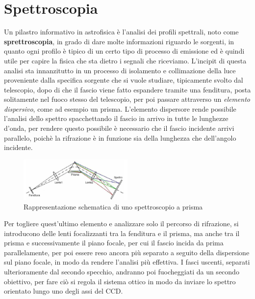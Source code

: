 \chapter{Spettroscopia}

Un pilastro informativo in astrofisica è l'analisi dei profili spettrali, noto come \textbf{sprettroscopia}, in grado di dare molte informazioni riguardo le sorgenti, in quanto ogni profilo è tipico di un certo tipo di processo di emissione ed è quindi utile per capire la fisica che sta dietro i segnali che riceviamo. L'incipit di questa analisi sta innanzitutto in un processo di isolamento e collimazione della luce proveniente dalla specifica sorgente che si vuole studiare, tipicamente svolto dal telescopio, dopo di che il fascio viene fatto espandere tramite una fenditura, posta solitamente nel fuoco stesso del telescopio, per poi passare attraverso un \textit{elemento dispersivo}, come ad esempio un prisma. L'elemento dispersore rende possibile l'analisi dello spettro spacchettando il fascio in arrivo in tutte le lunghezze d'onda, per rendere questo possibile è necessario che il fascio incidente arrivi parallelo, poichè la rifrazione è in funzione sia della lunghezza che dell'angolo incidente.

\begin{figure}[h]
    \centering
    \vspace{-5pt}
    \includegraphics[width=0.5\textwidth]{Immagini/Capitolo3/Spettroscopia_schema.PNG}
    \caption*{Rappresentazione schematica di uno spettroscopio a prisma}
    \vspace{-5pt}
\end{figure}

Per togliere quest'ultimo elemento e analizzare solo il percorso di rifrazione, si introducono delle lenti focalizzanti tra la fenditura e il prisma, ma anche tra il prisma e successivamente il piano focale, per cui il fascio incida da prima parallelamente, per poi essere reso ancora più separato a seguito della dispersione sul piano focale, in modo da rendere l'analisi più effettiva. I fasci uscenti, separati ulterioramente dal secondo specchio, andranno poi fuocheggiati da un secondo obiettivo, per fare ciò si regola il sistema ottico in modo da inviare lo spettro orientato lungo uno degli assi del CCD.

